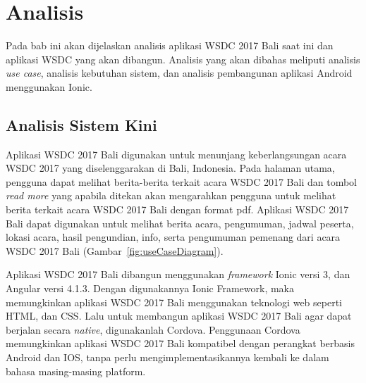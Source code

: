\chapter{Analisis}
\label{chap:analisis}

Pada bab ini akan dijelaskan analisis aplikasi WSDC 2017 Bali saat ini dan aplikasi WSDC yang akan dibangun. Analisis yang akan dibahas meliputi analisis {\it use case}, analisis kebutuhan sistem, dan analisis pembangunan aplikasi Android menggunakan Ionic.

\section{Analisis Sistem Kini}
\label{sec:analisisSistemKini}
Aplikasi WSDC 2017 Bali digunakan untuk menunjang keberlangsungan acara WSDC 2017 yang diselenggarakan di Bali, Indonesia. Pada halaman utama, pengguna dapat melihat berita-berita terkait acara WSDC 2017 Bali dan tombol {\it read more} yang apabila ditekan akan mengarahkan pengguna untuk melihat berita terkait acara WSDC 2017 Bali dengan format pdf. Aplikasi WSDC 2017 Bali dapat digunakan untuk melihat berita acara, pengumuman, jadwal peserta, lokasi acara, hasil pengundian, info, serta pengumuman pemenang dari acara WSDC 2017 Bali (Gambar~\ref{fig:useCaseDiagram}). 

Aplikasi WSDC 2017 Bali dibangun menggunakan {\it framework} Ionic versi 3, dan Angular versi 4.1.3. Dengan digunakannya Ionic Framework, maka memungkinkan aplikasi WSDC 2017 Bali menggunakan teknologi web seperti HTML, dan CSS. Lalu untuk membangun aplikasi WSDC 2017 Bali agar dapat berjalan secara {\it native}, digunakanlah Cordova. Penggunaan Cordova memungkinkan aplikasi WSDC 2017 Bali kompatibel dengan perangkat berbasis Android dan IOS, tanpa perlu mengimplementasikannya kembali ke dalam bahasa masing-masing platform.

